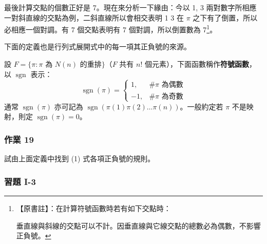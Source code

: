 最後計算交點的個數正好是 7。現在來分析一下緣由：今以 1, 3 兩對數字所相應一對斜直線的交點為例，二斜直線所以會相交表明 1 3 在 $\pi$ 之下有了倒置，所以必相應一個對調。有 7 個交點表明有 7 個對調，所以倒置數為 7\footnote{\begin{minipage}[t]{0.95\linewidth}【原書註】：在計算符號函數時若有如下交點時：\par\smallskip
\centering
{}\par\smallskip
\raggedright 垂直線與斜線的交點可以不計。因垂直線與它線交點的總數必為偶數，不影響正負號。
\end{minipage}}。

下面的定義也是行列式展開式中的每一項其正負號的來源。

\begin{definition}\label{def:b6-1-7}
設 $F = \{ \pi : \pi \text{ 為 } N(n) \text{ 的重排} \}$（$F$ 共有 $n!$ 個元素），下面函數稱作\textbf{符號函數}，以 $\operatorname{sgn}$ 表示：
\[ \operatorname{sgn}(\pi) = \begin{cases}
1, & \#\pi \text{ 為偶數} \\
-1, & \#\pi \text{ 為奇數}
\end{cases} \]
通常 $\operatorname{sgn}(\pi)$ 亦可記為 $\operatorname{sgn}(\pi(1)\pi(2)\dots\pi(n))$。一般約定若 $\pi$ 不是映射，則定 $\operatorname{sgn}(\pi) = 0$。
\end{definition}

\subsubsection*{作業 19}\label{hw:b6-1-19}
試由上面定義中找到 (1) 式各項正負號的規則。

\subsubsection*{習題 I-3}\label{sec:b6-ex1-3}


